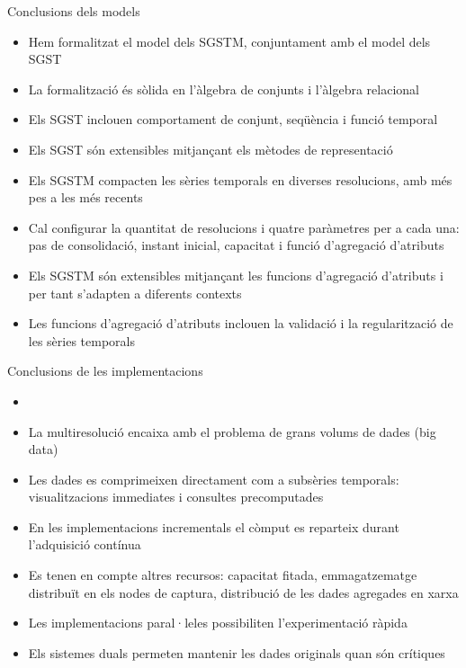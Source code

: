 \begin{frame}{Conclusions dels models}

  \begin{itemize}
  \item Hem formalitzat el model dels SGSTM, conjuntament amb el model dels SGST
  \item La formalització és sòlida en l’àlgebra de conjunts i l’àlgebra relacional

\item Els SGST inclouen comportament de conjunt, seqüència i funció temporal
\item Els SGST són extensibles mitjançant els mètodes de representació
\item Els SGSTM compacten les sèries temporals en diverses resolucions, amb més pes a les més recents
\item Cal configurar la quantitat de resolucions i quatre paràmetres per a cada una: pas de consolidació, instant inicial, capacitat i funció d’agregació d’atributs
\item Els SGSTM són extensibles mitjançant les funcions d’agregació d’atributs i per tant s’adapten a diferents contexts
\item Les funcions d’agregació d’atributs inclouen la validació i la regularització de les sèries temporals

  \end{itemize}


\end{frame}

\begin{frame}{Conclusions de les implementacions}
  \begin{itemize}
  \item 
\item La multiresolució encaixa amb el problema de grans volums de dades (big data)
\item Les dades es comprimeixen directament com a subsèries temporals: visualitzacions immediates i consultes precomputades
\item En les implementacions incrementals el còmput es reparteix durant l’adquisició contínua
\item Es tenen en compte altres recursos: capacitat fitada, emmagatzematge distribuït en els nodes de captura, distribució de les dades agregades en xarxa
\item Les implementacions paral·leles possibiliten l’experimentació ràpida
\item Els sistemes duals permeten mantenir les dades originals quan són crítiques
  \end{itemize}
\end{frame}

